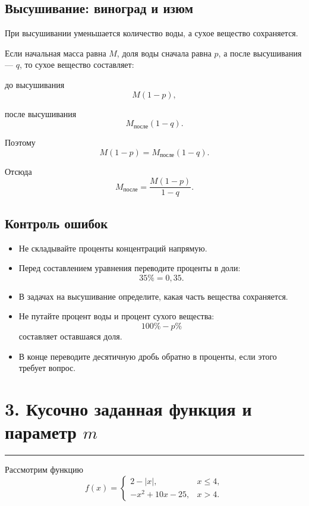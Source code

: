 \documentclass[a4paper,12pt]{article}
\newcommand{\sectionrule}{%
  \par
  \vspace{-0.35em}%
  {\color{accent}\rule{\linewidth}{0.6pt}}%
  \vspace{0.6em}%
}
\begin{document}
\subsection*{Высушивание: виноград и изюм}

При высушивании уменьшается количество воды, а сухое вещество
сохраняется.

Если начальная масса равна \(M\), доля воды сначала равна \(p\),
а после высушивания --- \(q\), то сухое вещество составляет:

до высушивания
\[
M(1-p),
\]

после высушивания
\[
M_{\text{после}}(1-q).
\]

Поэтому
\[
M(1-p)
=
M_{\text{после}}(1-q).
\]

Отсюда
\[
M_{\text{после}}
=
\frac{M(1-p)}{1-q}.
\]

\subsection*{Контроль ошибок}

\begin{itemize}
  \item Не складывайте проценты концентраций напрямую.

  \item Перед составлением уравнения переводите проценты в доли:
  \[
  35\%=0{,}35.
  \]

  \item В задачах на высушивание определите, какая часть вещества
  сохраняется.

  \item Не путайте процент воды и процент сухого вещества:
  \[
  100\%-p\%
  \]
  составляет оставшаяся доля.

  \item В конце переводите десятичную дробь обратно в проценты,
  если этого требует вопрос.
\end{itemize}


\section*{3. Кусочно заданная функция и параметр \(m\)}
\sectionrule

Рассмотрим функцию
\[
f(x)=
\begin{cases}
2-|x|, & x\le4,\\
-x^2+10x-25, & x>4.
\end{cases}
\]
\end{document}
